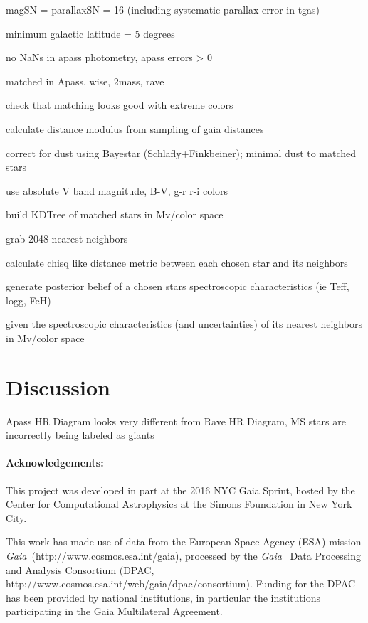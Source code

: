 \documentclass[11pt,letterpaper]{article}
\newcommand{\acronym}[1]{{\small{#1}}}
\newcommand{\project}[1]{\textsl{#1}}
\newcommand{\Gaia}{\project{Gaia}}
\begin{document}
magSN = parallaxSN = 16 (including systematic parallax error in tgas)

minimum galactic latitude = 5 degrees

no NaNs in apass photometry, apass errors > 0

matched in Apass, wise, 2mass, rave

check that matching looks good with extreme colors

calculate distance modulus from sampling of gaia distances

correct for dust using Bayestar (Schlafly+Finkbeiner); minimal dust to matched stars

use absolute V band magnitude, B-V, g-r r-i colors

build KDTree of matched stars in Mv/color space

grab 2048 nearest neighbors

calculate chisq like distance metric between each chosen star and its neighbors

generate posterior belief of a chosen stars spectroscopic characteristics (ie Teff, logg, FeH)

given the spectroscopic characteristics (and uncertainties) of its nearest neighbors in Mv/color space

\section{Discussion}

Apass HR Diagram looks very different from Rave HR Diagram, MS stars are incorrectly being labeled as giants

\paragraph{Acknowledgements:}
This project was developed in part at the 2016 NYC Gaia Sprint, hosted
by the Center for Computational Astrophysics at the Simons Foundation
in New York City.

This work has made use of data from the European Space Agency (ESA)
mission \Gaia\ (http://www.cosmos.esa.int/gaia), processed by the \Gaia\ %
Data Processing and Analysis Consortium (\acronym{DPAC},
http://www.cosmos.esa.int/web/gaia/dpac/consortium). Funding for the
\acronym{DPAC} has been provided by national institutions, in particular the
institutions participating in the Gaia Multilateral Agreement.
\end{document}
